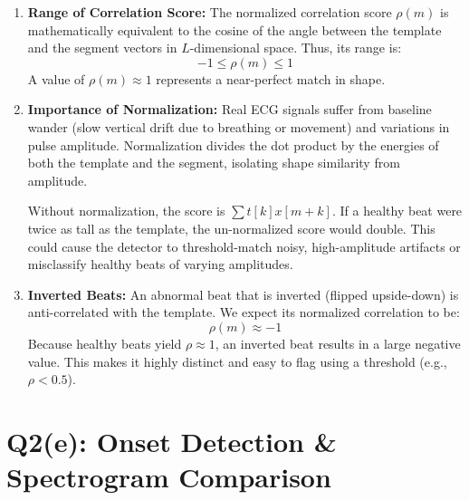 \documentclass[10pt, a4paper]{article}
\begin{document}
\begin{enumerate}
    \item \textbf{Range of Correlation Score:} The normalized correlation score $\rho(m)$ is mathematically equivalent to the cosine of the angle between the template and the segment vectors in $L$-dimensional space. Thus, its range is:
    \begin{equation}
    -1 \le \rho(m) \le 1
    \end{equation}
    A value of $\rho(m) \approx 1$ represents a near-perfect match in shape.
    
    \item \textbf{Importance of Normalization:} Real ECG signals suffer from baseline wander (slow vertical drift due to breathing or movement) and variations in pulse amplitude. Normalization divides the dot product by the energies of both the template and the segment, isolating shape similarity from amplitude. 
    
    Without normalization, the score is $\sum t[k]x[m+k]$. If a healthy beat were twice as tall as the template, the un-normalized score would double. This could cause the detector to threshold-match noisy, high-amplitude artifacts or misclassify healthy beats of varying amplitudes.
    
    \item \textbf{Inverted Beats:} An abnormal beat that is inverted (flipped upside-down) is anti-correlated with the template. We expect its normalized correlation to be:
    \begin{equation}
    \rho(m) \approx -1
    \end{equation}
    Because healthy beats yield $\rho \approx 1$, an inverted beat results in a large negative value. This makes it highly distinct and easy to flag using a threshold (e.g., $\rho < 0.5$).
\end{enumerate}

\section{Q2(e): Onset Detection \& Spectrogram Comparison}
\end{document}
